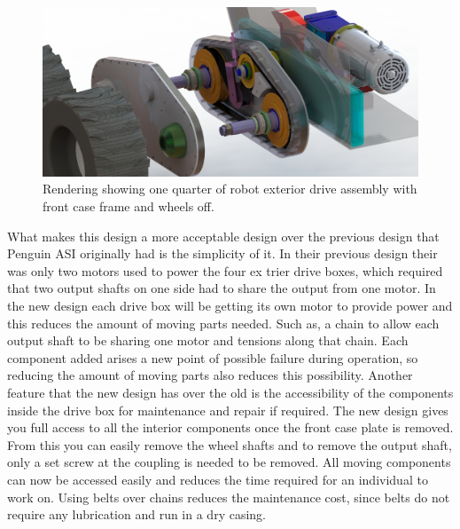\begin{figure}[htbp]
\includegraphics[width=\linewidth]{images/drive_box_presentation_rndr.jpg}
\caption{Rendering showing one quarter of robot exterior drive assembly with front case frame and wheels off. }
\label{fig:quart_assem}
\end{figure}

What makes this design a more acceptable design over the previous design that Penguin ASI originally had is the simplicity of it. In their previous design their was only two motors used to power the four ex trier drive boxes, which required that two output shafts on one side had to share the output from one motor. In the new design each drive box will be getting its own motor to provide power and this reduces the amount of moving parts needed. Such as, a chain to allow each output shaft to be sharing one motor and tensions along that chain. Each component added arises a new point of possible failure during operation, so reducing the amount of moving parts also reduces this possibility. Another feature that the new design has over the old is the accessibility of the components inside the drive box for maintenance and repair if required. The new design gives you full access to all the interior components once the front case plate is removed. From this you can easily remove the wheel shafts and to remove the output shaft, only a set screw at the coupling is needed to be removed. All moving components can now be accessed easily and reduces the time required for an individual to work on. Using belts over chains reduces the maintenance cost, since belts do not require any lubrication and run in a dry casing.


